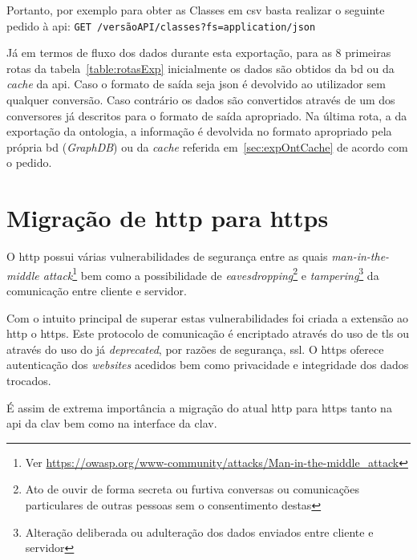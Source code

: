 Portanto, por exemplo para obter as Classes em \acrshort{csv} basta realizar o seguinte pedido à \acrshort{api}: \verb|GET /versãoAPI/classes?fs=application/json|

Já em termos de fluxo dos dados durante esta exportação, para as 8 primeiras rotas da tabela~\ref{table:rotasExp} inicialmente os dados são obtidos da \acrshort{bd} ou da \textit{cache} da \acrshort{api}. Caso o formato de saída seja \acrshort{json} é devolvido ao utilizador sem qualquer conversão. Caso contrário os dados são convertidos através de um dos conversores já descritos para o formato de saída apropriado. Na última rota, a da exportação da ontologia, a informação é devolvida no formato apropriado pela própria \acrshort{bd} (\textit{GraphDB}) ou da \textit{cache} referida em~\ref{sec:expOntCache} de acordo com o pedido.

\section{Migração de \acrshort{http} para \acrshort{https}}

O \acrfull{http} possui várias vulnerabilidades de segurança entre as quais \textit{man-in-the-middle attack}\footnote{Ver \url{https://owasp.org/www-community/attacks/Man-in-the-middle_attack}} bem como a possibilidade de \textit{eavesdropping}\footnote{Ato de ouvir de forma secreta ou furtiva conversas ou comunicações particulares de outras pessoas sem o consentimento destas} e \textit{tampering}\footnote{Alteração deliberada ou adulteração dos dados enviados entre cliente e servidor} da comunicação entre cliente e servidor.

Com o intuito principal de superar estas vulnerabilidades foi criada a extensão ao \acrshort{http} o \acrfull{https}. Este protocolo de comunicação é encriptado através do uso de \acrfull{tls} ou através do uso do já \textit{deprecated}, por razões de segurança, \acrfull{ssl}. O \acrshort{https} oferece autenticação dos \textit{websites} acedidos bem como privacidade e integridade dos dados trocados.

É assim de extrema importância a migração do atual \acrshort{http} para \acrshort{https} tanto na \acrshort{api} da \acrshort{clav} bem como na interface da \acrshort{clav}.

